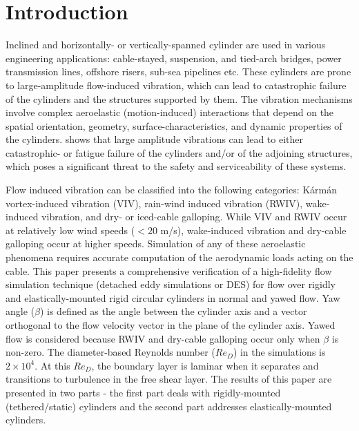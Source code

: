 \section{Introduction}
\label{sec:intro}
%
Inclined and horizontally- or vertically-spanned cylinder are used in various
engineering applications: cable-stayed, suspension, and tied-arch bridges,
power transmission lines, offshore risers, sub-sea pipelines etc. These
cylinders are prone to large-amplitude flow-induced vibration, which can lead
to catastrophic failure of the cylinders and the structures supported by them.
The vibration mechanisms involve complex aeroelastic (motion-induced)
interactions that depend on the spatial orientation, geometry,
surface-characteristics, and dynamic properties of the cylinders.
\cite{davenport1995dynamics} shows that large amplitude vibrations can lead to
either catastrophic- or fatigue failure of the cylinders and/or of the
adjoining structures, which poses a significant threat to the safety and
serviceability of these systems.

Flow induced vibration can be classified into the following categories:
K\'arm\'an vortex-induced vibration (VIV), rain-wind induced vibration (RWIV),
wake-induced vibration, and dry- or iced-cable galloping. While VIV and RWIV
occur at relatively low wind speeds ($<20$ m/s), wake-induced vibration and
dry-cable galloping occur at higher speeds. Simulation of any of these
aeroelastic phenomena requires accurate computation of the aerodynamic loads
acting on the cable.  This paper presents a comprehensive verification of a
high-fidelity flow simulation technique (detached eddy simulations or DES) for
flow over rigidly and elastically-mounted rigid circular cylinders in normal
and yawed flow. Yaw angle ($\beta$) is defined as the angle between the
cylinder axis and a vector orthogonal to the flow velocity vector in the plane
of the cylinder axis. Yawed flow is considered because RWIV and dry-cable
galloping occur only when $\beta$ is non-zero. The diameter-based Reynolds
number ($Re_D$) in the simulations is $2\times 10^4$. At this $Re_D$, the
boundary layer is laminar when it separates and transitions to turbulence in
the free shear layer. The results of this paper are presented in two parts -
the first part deals with rigidly-mounted (tethered/static) cylinders and the
second part addresses elastically-mounted cylinders.

